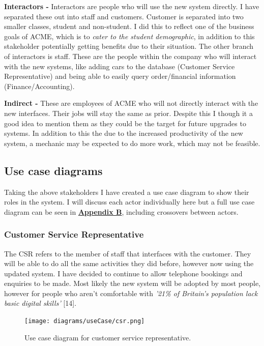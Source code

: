     \noindent\textbf{Interactors -} Interactors are people who will use the new system directly. I have separated these out into staff and customers.
    Customer is separated into two smaller classes, student and non-student. I did this to reflect one of the business goals of ACME, which is to \textit{
    cater to the student demographic}, in addition to this stakeholder potentially getting benefits due to their situation. The other branch of interactors
    is staff. These are the people within the company who will interact with the new systems, like adding cars to the database (Customer Service Representative)
    and being able to easily query order/financial information (Finance/Accounting).

    \vspace{0.2cm}

    \noindent\textbf{Indirect -} These are employees of ACME who will not directly interact with the new interfaces. Their jobs will stay the same as prior. Despite
    this I though it a good idea to mention them as they could be the target for future upgrades to systems. In addition to this the due to the increased 
    productivity of the new system, a mechanic may be expected to do more work, which may not be feasible.

  \subsection{Use case diagrams}
    Taking the above stakeholders I have created a use case diagram to show their roles in the system. I will discuss each actor individually here but a full
    use case diagram can be seen in \hyperref[sec:AppendixB]{\textbf{Appendix B}}, including crossovers between actors.

    \subsubsection{Customer Service Representative}
      The CSR refers to the member of staff that interfaces with the customer. They will be able to do all the same activities they did before, however now using
      the updated system. I have decided to continue to allow telephone bookings and enquiries to be made. Most likely the new system will be
      adopted by most people, however for people who aren't comfortable with \textit{'21\% of Britain's population lack basic digital
      skills'} [14].
      \begin{figure}[H]
        \centering
        \texttt{[image: diagrams/useCase/csr.png]}
        \caption{Use case diagram for customer service representative.}
        \label{fig:UCcsr}
      \end{figure}


